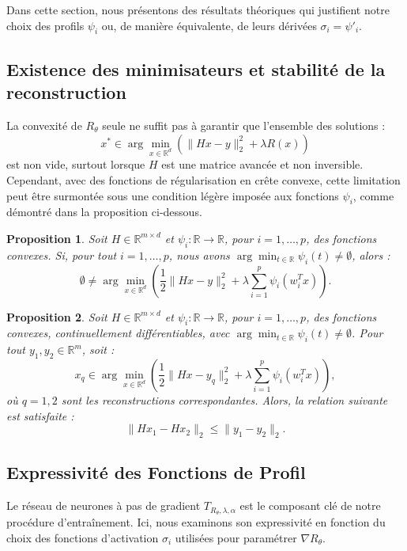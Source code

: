 \documentclass[a4paper, 12pt]{report} %
\newtheorem{proposition}{Proposition}[section]
\begin{document}
Dans cette section, nous présentons des résultats théoriques qui justifient notre choix des profils \( \psi_i \) ou, de manière équivalente, de leurs dérivées \( \sigma_i = \psi'_i \).

\subsection{Existence des minimisateurs et stabilité de la reconstruction}

La convexité de \( R_\theta \) seule ne suffit pas à garantir que l'ensemble des solutions :  
\[
x^* \in \arg \min_{x \in \mathbb{R}^d} \left( \| Hx - y \|_2^2 + \lambda R(x) \right)
\]  
est non vide, surtout lorsque \( H \) est une matrice avancée et non inversible. Cependant, avec des fonctions de régularisation en crête convexe, cette limitation peut être surmontée sous une condition légère imposée aux fonctions \( \psi_i \), comme démontré dans la proposition ci-dessous.

\begin{proposition}
Soit \( H \in \mathbb{R}^{m \times d} \) et \( \psi_i : \mathbb{R} \to \mathbb{R} \), pour \( i = 1, \ldots, p \), des fonctions convexes. Si, pour tout \( i = 1, \ldots, p \), nous avons \( \arg \min_{t \in \mathbb{R}} \psi_i(t) \neq \emptyset \), alors :  
\[
\emptyset \neq \arg \min_{x \in \mathbb{R}^d} \left( \frac{1}{2} \| Hx - y \|_2^2 + \lambda \sum_{i=1}^p \psi_i(w_i^T x) \right).
\]
\end{proposition}
\begin{proposition}

Soit \( H \in \mathbb{R}^{m \times d} \) et \( \psi_i : \mathbb{R} \to \mathbb{R} \), pour \( i = 1, \ldots, p \), des fonctions convexes, continuellement différentiables, avec \( \arg \min_{t \in \mathbb{R}} \psi_i(t) \neq \emptyset \). Pour tout \( y_1, y_2 \in \mathbb{R}^m \), soit :  
\[
x_q \in \arg \min_{x \in \mathbb{R}^d} \left( \frac{1}{2} \| Hx - y_q \|_2^2 + \lambda \sum_{i=1}^p \psi_i(w_i^T x) \right),
\]
où \( q = 1, 2 \) sont les reconstructions correspondantes. Alors, la relation suivante est satisfaite :  
\[
\| Hx_1 - Hx_2 \|_2 \leq \| y_1 - y_2 \|_2.
\]
\end{proposition}
\subsection{Expressivité des Fonctions de Profil}
Le réseau de neurones à pas de gradient \( T_{R_\theta,\lambda,\alpha} \) est le composant clé de notre procédure d'entraînement. Ici, nous examinons son expressivité en fonction du choix des fonctions d'activation \( \sigma_i \) utilisées pour paramétrer \( \nabla R_\theta \).
\end{document}

